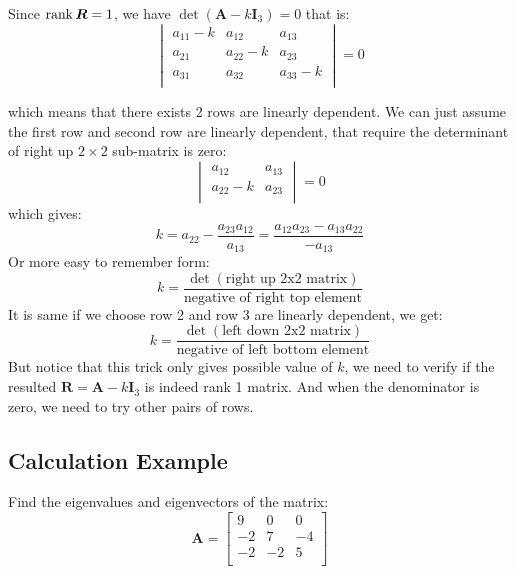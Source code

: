 \documentclass{article}
\begin{document}
Since $\operatorname{rank}\boldsymbol R=1$, we have $\det(\boldsymbol A-k\boldsymbol I_3)=0$
that is:
\[
	\begin{vmatrix}
		a_{11}-k & a_{12} & a_{13} \\
		a_{21} & a_{22}-k & a_{23} \\
		a_{31} & a_{32} & a_{33}-k\\
	\end{vmatrix} = 0
\]

which means that there exists 2 rows are linearly dependent.
We can just assume the first row and second row are linearly dependent,
that require the determinant of right up $2\times2$ sub-matrix is zero:
\[
	\begin{vmatrix}
		a_{12} & a_{13} \\
		a_{22}-k & a_{23} \\
	\end{vmatrix} = 0
\]
which gives:
\[
	k = a_{22} - \frac{a_{23} a_{12}}{a_{13}} = \frac{a_{12} a_{23} - a_{13} a_{22}}{-a_{13}}
\]
Or more easy to remember form: 
\[
	k=\frac{\det(\text{right up 2x2 matrix})}
	{\text{negative of right top element}}
\]
It is same if we choose row 2 and row 3 are linearly dependent, we get:
\[
	k=\frac{\det(\text{left down 2x2 matrix})}
	{\text{negative of left bottom element}}
\]
But notice that this trick only gives possible value of \( k \),
we need to verify if the resulted \( \boldsymbol R = \boldsymbol A - k
\boldsymbol I_3 \) is indeed rank 1 matrix. And when the denominator is zero,
we need to try other pairs of rows.

\subsection{Calculation Example}

Find the eigenvalues and eigenvectors of the matrix:
\[
\boldsymbol A = \begin{bmatrix}
9 & 0 & 0 \\
-2 & 7 & -4 \\
-2 & -2 & 5 \\
\end{bmatrix}
\]
\end{document}
